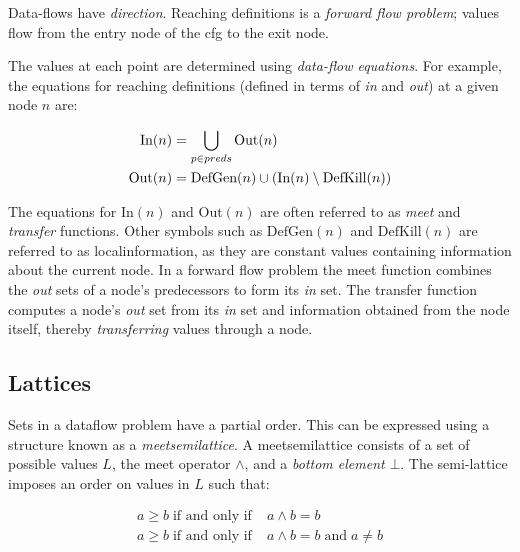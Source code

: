 \documentclass[bsc,twoside,singlespacing,parskip,logo,notimes,normalheadings]{infthesis}
\begin{document}
        Data-flows have {\em direction}. Reaching definitions is a
        {\em forward flow problem}; values flow from the entry node of
        the \gls{cfg} to the exit node.

        The values at each point are determined using {\em data-flow
          equations}. For example, the equations for reaching
        definitions (defined in terms of {\em in} and {\em out}) at a
        given node $n$ are:
        
        \vspace{-7mm}
        \begin{align*}
          \textnormal{In}(n)  & = \bigcup_{p \in preds} \textnormal{Out}(n) \\
          \textnormal{Out}(n) & = \textnormal{DefGen}(n) \cup (\textnormal{In}(n) \setminus \textnormal{DefKill}(n))
        \end{align*}
        
        The equations for $\text{In}(n)$ and $\text{Out}(n)$ are often
        referred to as {\em \gls{meet}} and {\em \gls{transfer}}
        functions. Other symbols such as $\text{DefGen}(n)$ and
        $\text{DefKill}(n)$ are referred to as \gls{localinformation},
        as they are constant values containing information about the
        current node. In a forward flow problem the meet function
        combines the {\em out} sets of a node's predecessors to form
        its {\em in} set. The \gls{transfer} function computes a
        node's {\em out} set from its {\em in} set and information
        obtained from the node itself, thereby {\em transferring}
        values through a node.

	\subsection{Lattices}
	Sets in a \gls{dataflow} problem have a partial order. This
        can be expressed using a structure known as a {\em
          \gls{meetsemilattice}}. A \gls{meetsemilattice} consists of
        a set of possible values $L$, the meet operator $\land$, and a
        {\em bottom element} $\bot$. The semi-lattice imposes an order
        on values in $L$ such that:
        
        \vspace{-1cm}
        \begin{align*}
          a \geq b \;\text{if and only if}\; & a \land b = b \\
          a \ge  b \;\text{if and only if}\; & a \land b = b \;\text{and}\; a \neq b
        \end{align*}
        \vspace{-1cm}
        
\end{document}
